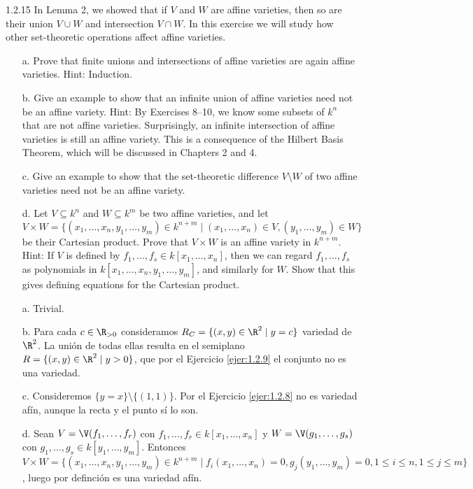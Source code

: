 \documentclass[twoside]{article}
\begin{document}
\begin{ejercicio}{1.2.15}
In Lemma 2, we showed that if $V$ and $W$ are affine varieties, then so are their union $V∪W$
and intersection $V ∩W$. In this exercise we will study how other set-theoretic operations
affect affine varieties.
\begin{itemize}
\item[a.] Prove that finite unions and intersections of affine varieties are again affine varieties.
Hint: Induction.
\item[b.] Give an example to show that an infinite union of affine varieties need not be an
affine variety. Hint: By Exercises 8–10, we know some subsets of $k^n$ that are not
affine varieties. Surprisingly, an infinite intersection of affine varieties is still an affine
variety. This is a consequence of the Hilbert Basis Theorem, which will be discussed
in Chapters 2 and 4.
\item[c.] Give an example to show that the set-theoretic difference $V \setminus W$ of two affine varieties
need not be an affine variety.
\item[d.] Let $V ⊆ k^n$ and $W ⊆ k^m$ be two affine varieties, and let
$$V × W = \{(x_1,\dots , x_n, y_1,\dots , y_m) ∈ k^{n+m} \mid  (x_1, . . . , x_n) ∈ V, (y_1, . . . , y_m) ∈ W\}$$
be their Cartesian product. Prove that $V ×W$ is an affine variety in $k^{n+m}$. Hint: If $V$ is
defined by $f_1,\dots , f_s ∈ k[x_1,\dots , x_n]$, then we can regard $f_1,\dots, f_s$ as polynomials in
$k[x_1,\dots , x_n, y_1,\dots, y_m]$, and similarly for $W$. Show that this gives defining equations
for the Cartesian product.
\end{itemize}
\end{ejercicio}
\begin{solucion}
\begin{itemize}
\item[]
\item[a.] Trivial.
\item[b.] Para cada $c\in \R_{>0}$ consideramos $R_C=\{(x,y)\in\R^2 \mid y=c\}$ variedad de $\R^2$. La unión de todas ellas resulta en el semiplano $R =\{(x,y)\in\R^2 \mid y>0\}$, que por el Ejercicio \ref{ejer:1.2.9} el conjunto no es una variedad.
\item[c.] Consideremos $\{y=x\}\setminus \{(1,1)\}$. Por el Ejercicio \ref{ejer:1.2.8} no es variedad afín, aunque la recta y el punto sí lo son.
\item[d.] Sean $V=\V(f_1,\dots, f_r)$ con $f_1,\dots, f_r\in k[x_1,\dots, x_n]$ y $W=\V(g_1,\dots, g_s)$ con $g_1,\dots, g_s\in k[y_1,\dots, y_m]$. Entonces $V\times W=\{(x_1,\dots, x_n,y_1,\dots, y_m)\in k^{n+m}\mid f_i(x_1,\dots, x_n)=0, g_j(y_1,\dots, y_m)=0, 1\leq i\leq n, 1\leq j\leq m\}$, luego por definción es una variedad afín.
\end{itemize}
\end{solucion}
\end{document}

